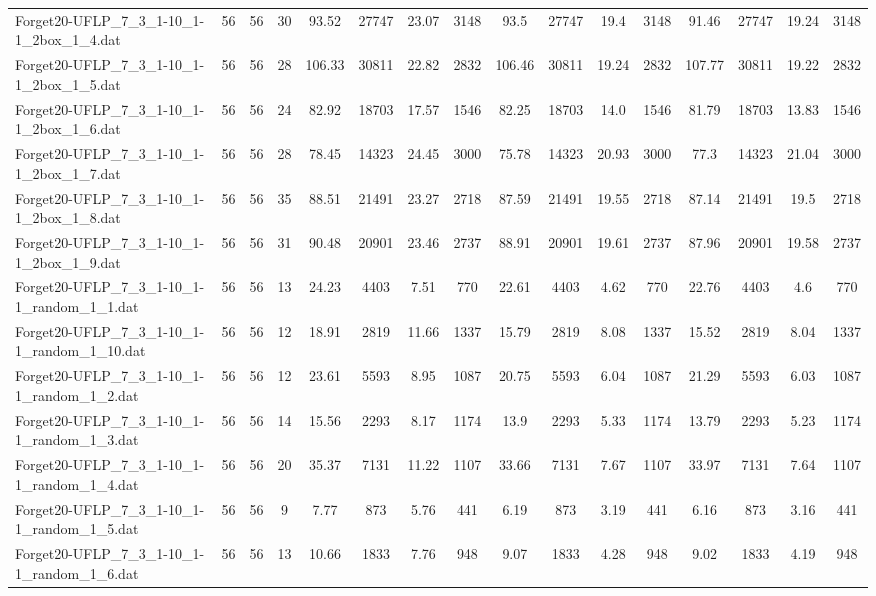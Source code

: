 \begin{sidewaystable}[!ht]
{\begin{tabular}{lccccccccccccccc}
Forget20-UFLP\_7\_3\_1-10\_1-1\_2box\_1\_4.dat & 56 & 56 & 30 & 93.52 & 27747 & 23.07 & 3148 & 93.5 & 27747 & 19.4 & 3148 & 91.46 & 27747 & 19.24 & 3148 \\
Forget20-UFLP\_7\_3\_1-10\_1-1\_2box\_1\_5.dat & 56 & 56 & 28 & 106.33 & 30811 & 22.82 & 2832 & 106.46 & 30811 & 19.24 & 2832 & 107.77 & 30811 & 19.22 & 2832 \\
Forget20-UFLP\_7\_3\_1-10\_1-1\_2box\_1\_6.dat & 56 & 56 & 24 & 82.92 & 18703 & 17.57 & 1546 & 82.25 & 18703 & 14.0 & 1546 & 81.79 & 18703 & 13.83 & 1546 \\
Forget20-UFLP\_7\_3\_1-10\_1-1\_2box\_1\_7.dat & 56 & 56 & 28 & 78.45 & 14323 & 24.45 & 3000 & 75.78 & 14323 &  \textcolor{blue2}{20.93} & 3000 & 77.3 & 14323 & 21.04 & 3000 \\
Forget20-UFLP\_7\_3\_1-10\_1-1\_2box\_1\_8.dat & 56 & 56 & 35 & 88.51 & 21491 & 23.27 & 2718 & 87.59 & 21491 & 19.55 & 2718 & 87.14 & 21491 &  \textcolor{blue2}{19.5} & 2718 \\
Forget20-UFLP\_7\_3\_1-10\_1-1\_2box\_1\_9.dat & 56 & 56 & 31 & 90.48 & 20901 & 23.46 & 2737 & 88.91 & 20901 & 19.61 & 2737 & 87.96 & 20901 & 19.58 & 2737 \\
Forget20-UFLP\_7\_3\_1-10\_1-1\_random\_1\_1.dat & 56 & 56 & 13 & 24.23 & 4403 & 7.51 & 770 & 22.61 & 4403 & 4.62 & 770 & 22.76 & 4403 &  \textcolor{blue2}{4.6} & 770 \\
Forget20-UFLP\_7\_3\_1-10\_1-1\_random\_1\_10.dat & 56 & 56 & 12 & 18.91 & 2819 & 11.66 & 1337 & 15.79 & 2819 & 8.08 & 1337 & 15.52 & 2819 & 8.04 & 1337 \\
Forget20-UFLP\_7\_3\_1-10\_1-1\_random\_1\_2.dat & 56 & 56 & 12 & 23.61 & 5593 & 8.95 & 1087 & 20.75 & 5593 & 6.04 & 1087 & 21.29 & 5593 &  \textcolor{blue2}{6.03} & 1087 \\
Forget20-UFLP\_7\_3\_1-10\_1-1\_random\_1\_3.dat & 56 & 56 & 14 & 15.56 & 2293 & 8.17 & 1174 & 13.9 & 2293 & 5.33 & 1174 & 13.79 & 2293 &  \textcolor{blue2}{5.23} & 1174 \\
Forget20-UFLP\_7\_3\_1-10\_1-1\_random\_1\_4.dat & 56 & 56 & 20 & 35.37 & 7131 & 11.22 & 1107 & 33.66 & 7131 & 7.67 & 1107 & 33.97 & 7131 &  \textcolor{blue2}{7.64} & 1107 \\
Forget20-UFLP\_7\_3\_1-10\_1-1\_random\_1\_5.dat & 56 & 56 & 9 & 7.77 & 873 & 5.76 & 441 & 6.19 & 873 & 3.19 & 441 & 6.16 & 873 &  \textcolor{blue2}{3.16} & 441 \\
Forget20-UFLP\_7\_3\_1-10\_1-1\_random\_1\_6.dat & 56 & 56 & 13 & 10.66 & 1833 & 7.76 & 948 & 9.07 & 1833 & 4.28 & 948 & 9.02 & 1833 & 4.19 & 948 \\

\end{tabular}}
\end{sidewaystable}
